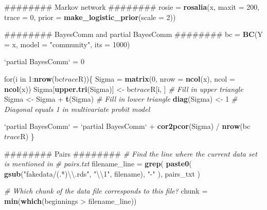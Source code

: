 \documentclass[11pt,]{article}
\newenvironment{Shaded}{\begin{snugshade}}{\end{snugshade}}
\newcommand{\KeywordTok}[1]{\textcolor[rgb]{0.13,0.29,0.53}{\textbf{{#1}}}}
\newcommand{\DataTypeTok}[1]{\textcolor[rgb]{0.13,0.29,0.53}{{#1}}}
\newcommand{\DecValTok}[1]{\textcolor[rgb]{0.00,0.00,0.81}{{#1}}}
\newcommand{\CharTok}[1]{\textcolor[rgb]{0.31,0.60,0.02}{{#1}}}
\newcommand{\StringTok}[1]{\textcolor[rgb]{0.31,0.60,0.02}{{#1}}}
\newcommand{\CommentTok}[1]{\textcolor[rgb]{0.56,0.35,0.01}{\textit{{#1}}}}
\newcommand{\NormalTok}[1]{{#1}}
\begin{document}
\begin{Shaded}
\begin{Highlighting}[]
  \NormalTok{######## Markov network ########}
  \NormalTok{rosie =}\StringTok{ }\KeywordTok{rosalia}\NormalTok{(x, }\DataTypeTok{maxit =} \DecValTok{200}\NormalTok{, }\DataTypeTok{trace =} \DecValTok{0}\NormalTok{, }\DataTypeTok{prior =} \KeywordTok{make_logistic_prior}\NormalTok{(}\DataTypeTok{scale =} \DecValTok{2}\NormalTok{))}
  
  \NormalTok{######## BayesComm and partial BayesComm ########}
  \NormalTok{bc =}\StringTok{ }\KeywordTok{BC}\NormalTok{(}\DataTypeTok{Y =} \NormalTok{x, }\DataTypeTok{model =} \StringTok{"community"}\NormalTok{, }\DataTypeTok{its =} \DecValTok{1000}\NormalTok{)}
  
  \StringTok{`}\DataTypeTok{partial BayesComm}\StringTok{`} \NormalTok{=}\StringTok{ }\DecValTok{0}
  
  \NormalTok{for(i in }\DecValTok{1}\NormalTok{:}\KeywordTok{nrow}\NormalTok{(bc$trace$R))\{}
    \NormalTok{Sigma =}\StringTok{ }\KeywordTok{matrix}\NormalTok{(}\DecValTok{0}\NormalTok{, }\DataTypeTok{nrow =} \KeywordTok{ncol}\NormalTok{(x), }\DataTypeTok{ncol =} \KeywordTok{ncol}\NormalTok{(x))}
    \NormalTok{Sigma[}\KeywordTok{upper.tri}\NormalTok{(Sigma)] <-}\StringTok{ }\NormalTok{bc$trace$R[i, ]  }\CommentTok{# Fill in upper triangle}
    \NormalTok{Sigma <-}\StringTok{ }\NormalTok{Sigma +}\StringTok{ }\KeywordTok{t}\NormalTok{(Sigma)                   }\CommentTok{# Fill in lower triangle}
    \KeywordTok{diag}\NormalTok{(Sigma) <-}\StringTok{ }\DecValTok{1}  \CommentTok{# Diagonal equals 1 in multivariate probit model}
    
    \StringTok{`}\DataTypeTok{partial BayesComm}\StringTok{`} \NormalTok{=}\StringTok{ `}\DataTypeTok{partial BayesComm}\StringTok{`} \NormalTok{+}\StringTok{ }\KeywordTok{cor2pcor}\NormalTok{(Sigma) /}\StringTok{ }\KeywordTok{nrow}\NormalTok{(bc$trace$R)}
  \NormalTok{\}}
  
  \NormalTok{######## Pairs ########}
  \CommentTok{# Find the line where the current data set is mentioned in}
  \CommentTok{# pairs.txt}
  \NormalTok{filename_line =}\StringTok{ }\KeywordTok{grep}\NormalTok{(}
    \KeywordTok{paste0}\NormalTok{(}
      \KeywordTok{gsub}\NormalTok{(}\StringTok{"fakedata/(.*)}\CharTok{\textbackslash{}\textbackslash{}}\StringTok{.rds"}\NormalTok{, }\StringTok{"}\CharTok{\textbackslash{}\textbackslash{}}\StringTok{1"}\NormalTok{, filename),}
      \StringTok{"-"}
    \NormalTok{),}
    \NormalTok{pairs_txt}
  \NormalTok{)}
  
  \CommentTok{# Which chunk of the data file corresponds to this file?}
  \NormalTok{chunk =}\StringTok{ }\KeywordTok{min}\NormalTok{(}\KeywordTok{which}\NormalTok{(beginnings >}\StringTok{ }\NormalTok{filename_line))}
  

\end{Highlighting}
\end{Shaded}
\end{document}
